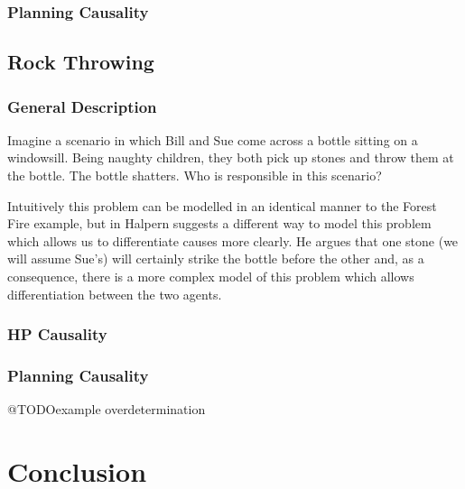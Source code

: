 \documentclass{article}
\theoremstyle{plain}
\theoremstyle{definition}
\begin{document}
\subsubsection*{Planning Causality}

\subsection{Rock Throwing}
\subsubsection*{General Description}
Imagine a scenario in which Bill and Sue come across a bottle sitting on a windowsill. Being naughty children, they both pick up stones and throw them at the bottle. The bottle shatters. Who is responsible in this scenario?

Intuitively this problem can be modelled in an identical manner to the Forest Fire example, but in \cite{halpern2005causes} Halpern suggests a different way to model this problem which allows us to differentiate causes more clearly. He argues that one stone (we will assume Sue's) will certainly strike the bottle before the other and, as a consequence, there is a more complex model of this problem which allows differentiation between the two agents.

\subsubsection*{HP Causality}

\subsubsection*{Planning Causality}


@TODOexample overdetermination
\section{Conclusion}








 

\end{document}
